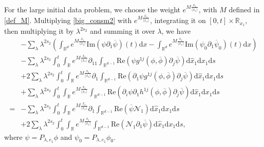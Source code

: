 \documentclass[10pt,twoside,a4paper]{article}
\numberwithin{equation}{section}\allowdisplaybreaks
\begin{document}
For the large initial data problem, we choose the weight $e^{M \frac{x_1}{\langle x_1\rangle}}$, with $M$ defined in \eqref{def_M}. 
 Multiplying  \eqref{big_consm2} with  $ e^{M \frac{x_1}{\langle x_1\rangle} }$, integrating it on $ [0,t]\times\mathbb{R}_{x_1} $, then multiplying it by $ \lambda^{2 s_2} $ and summing it over $ \lambda $,  we have
\begin{align} 
	&- \sum_{\lambda} \lambda^{ 2s_2}	\left(  \int_{\mathbb{R}^{d}} e^{M \frac{x_1}{\langle x_1\rangle} }   \mathrm{Im}\left( \psi \partial_1 \overline{\psi}\right)(t)   \mathrm{d} x -\int_{\mathbb{R}^d}   e^{M \frac{x_1}{\langle x_1\rangle} }   \mathrm{Im}\left( \psi_0 \partial_1 \overline{\psi}_0\right)(t)   \mathrm{d} x  \right)\label{big_me_t1}\\
	&- \sum_{\lambda} \lambda^{ 2s_2}\int_0^t \int_{\mathbb{R}}   	e^{M \frac{x_1}{\langle x_1\rangle} }   \partial_{11} \int_{\mathbb{R}^{d-1}} \mathrm{Re}\left( \psi  g^{1j} (\phi,\overline{\phi})\partial_j \overline{\psi}\right) \mathrm{d} \hat{x}_1   \mathrm{d} x_1 \mathrm{d} s\label{big_me_t2}\\
	&+2 \sum_{\lambda} \lambda^{ 2s_2}  \int_0^t\int_{\mathbb{R}}    	e^{M \frac{x_1}{\langle x_1\rangle} }   \partial_1 \int_{\mathbb{R}^{d-1}} \mathrm{Re}\left(\partial_1 \psi g^{1j} (\phi,\overline{\phi})\partial_j \overline{\psi}\right) \mathrm{d} \hat{x}_1  \mathrm{d} x_1 \mathrm{d} s \label{big_me_t3} \\
	&+\sum_{\lambda} \lambda^{ 2s_2} \int_0^t	\int_{\mathbb{R}}e^{M \frac{x_1}{\langle x_1\rangle} }   \int_{\mathbb{R}^{d-1}}  \mathrm{Re}\left(\partial_{i} \psi  \partial_1 h^{1j}(\phi,\overline{\phi}) \partial_j \overline{\psi }\right) \mathrm{d} \hat{x}_1  \mathrm{d} x_1 \mathrm{d} s \label{big_me_t4}\\
	=&- \sum_{\lambda} \lambda^{ 2s_2}\int_0^t	\int_{\mathbb{R}}e^{M \frac{x_1}{\langle x_1\rangle} }   \partial_1\int_{\mathbb{R}^{d-1}}   \mathrm{Re}\left(  \overline{\psi} \mathcal{N}_1\right) \mathrm{d} \hat{x}_1  \mathrm{d} x_1 \mathrm{d} s\label{big_me_t5}\\
	&+2\sum_{\lambda} \lambda^{ 2s_2}\int_0^t	\int_{\mathbb{R}}e^{M \frac{x_1}{\langle x_1\rangle} }  \int_{\mathbb{R}^{d-1}}  \mathrm{Re} \left(\mathcal{N}_1 \partial_1  \overline{\psi}\right)   \mathrm{d} \hat{x}_1  \mathrm{d} x_1 \mathrm{d} s\label{big_me_t6},
\end{align}
where $  \psi=P_{\lambda,e_1}  \phi  $ and $ \psi_0 =P_{\lambda, e_1}  \phi_0. $
\end{document}
